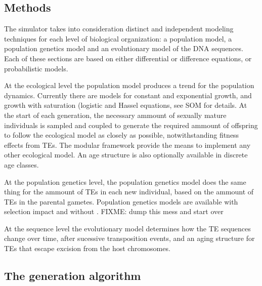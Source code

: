 \documentclass{bioinfo}
\begin{document}
\begin{methods}
\section{Methods}



The simulator takes into consideration distinct and independent
modeling techniques for each level of biological organization: a
population model, a population genetics model and an evolutionary model of
the DNA sequences. Each of these sections are based on either
differential or difference equations, or probabilistic models.

At the ecological level the population model produces a trend for the
population dynamics. Currently there are models for constant and
exponential growth, and growth with saturation (logistic and Hassel
equations, see SOM for details. At the start of each generation, the
necessary ammount of sexually mature individuals is sampled and
coupled to generate the required ammount of offspring to follow the
ecological model as closely as possible, notwithstanding fitness
effects from TEs. The modular framework provide the means to implement
any other ecological model. An age structure is also optionally
available in discrete age classes.

At the population genetics level, the population genetics model does the
same thing for the ammount of TEs in each new individual, based on the
ammount of TEs in the parental gametes. Population genetics models are
available with selection impact \citep{SKR05} and without
\citep{rouzic2005}. FIXME: dump this mess and start over

At the sequence level the evolutionary model determines how the TE
sequences change over time, after sucessive transposition events, and
an aging structure for TEs that escape excision from the host
chromosomes.


\subsection{The generation algorithm}


\end{methods}
\end{document}
